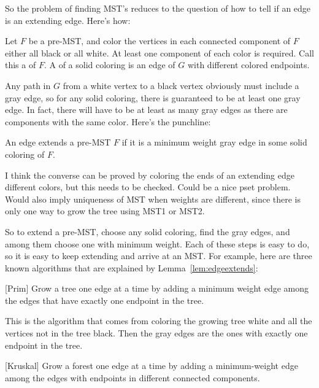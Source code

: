So the problem of finding MST's reduces to the question of how to tell
if an edge is an extending edge.  Here's how:

\begin{definition}
Let $F$ be a pre-MST, and color the vertices in each connected
component of $F$ either all black or all white.  At least one
component of each color is required.  Call this a  of $F$.  A  of a
solid coloring is an edge of $G$ with different colored endpoints.
\end{definition}

Any path in $G$ from a white vertex to a black vertex obviously must
include a gray edge, so for any solid coloring, there is guaranteed to
be at least one gray edge.  In fact, there will have to be at least as
many gray edges as there are components with the same color.  Here's
the punchline:

\begin{lemma}\label{lem:edgeextends}
An edge extends a pre-MST $F$ if it is a minimum weight gray edge in
some solid coloring of $F$.
\end{lemma}

\begin{editingnotes}
I think the converse can be proved by coloring the ends of an
extending edge different colors, but this needs to be checked.  Could
be a nice pset problem.  Would also imply uniqueness of MST when
weights are different, since there is only one way to grow the tree
using MST1 or MST2.
\end{editingnotes}

So to extend a pre-MST, choose any solid coloring, find the gray
edges, and among them choose one with minimum weight.  Each of these
steps is easy to do, so it is easy to keep extending and arrive at an
MST.  For example, here are three known algorithms that are explained
by Lemma~\ref{lem:edgeextends}:

\begin{algorithm}\label{alg:MST1}[Prim]
  Grow a tree one edge at a time by adding a minimum weight edge
  among the edges that have exactly one endpoint in the tree.
\end{algorithm}

This is the algorithm that comes from coloring the growing tree white
and all the vertices not in the tree black.  Then the gray edges are
the ones with exactly one endpoint in the tree.

\begin{algorithm}\label{alg:MST2}[Kruskal]
  Grow a forest one edge at a time by adding a minimum-weight edge
  among the edges with endpoints in different connected components.
\end{algorithm}

